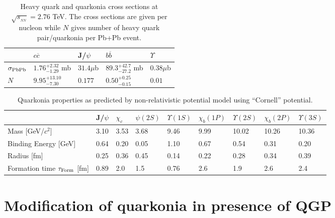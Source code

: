 \documentclass[aps,prc,preprint,superscriptaddress,showpacs,showkeys]{revtex4-1}
\begin{document}
\begin{table}
\caption[]{Heavy quark and quarkonia cross sections at
$\sqrt{s_{_{NN}}}= 2.76$ TeV. The cross sections are given per nucleon while
$N$ gives number of heavy quark pair/quarkonia per Pb+Pb event.}
\label{NLOcros}
\begin{tabular}{l|l|l|l|l} 
\hline 
\hline
                     & $ c \overline c$           &J/$\psi$      & $ b \overline b$           & $\Upsilon$   \\              
\hline
$\sigma_{\rm PbPb}$  & $1.76^{+2.32}_{-1.29}$ mb  & $31.4 \mu$b  & $89.3^{+42.7}_{-27.2}$ mb  & $0.38 \mu$b  \\
$N$                  &$9.95^{+13.10}_{-7.30}$     & $0.177$      & $0.50^{+0.25}_{-0.15}$     & $0.01$       \\
\hline
\hline
\end{tabular}
\end{table}


\begin{table}
\caption[]{Quarkonia properties as predicted by non-relativistic potential model using 
``Cornell'' potential\cite{YSuppAbdShuk}.}
\label{QuarkoniaProperties}
\begin{tabular}{l|l|l|l|l|l|l|l|l} 
\hline   
\hline
    &J/$\psi$  &$\chi_c$  &$\psi(2S)$ &$\Upsilon(1S)$ &$\chi_b(1P)$ &$\Upsilon(2S)$ &$\chi_b(2P)$ &$\Upsilon(3S)$ \\ 
\hline 
Mass [GeV/$c^2$]                      &3.10     &3.53  &3.68  &9.46  &9.99  &10.02  &10.26   &10.36 \\
Binding Energy [GeV]                  &0.64     &0.20  &0.05  &1.10  &0.67  &0.54   &0.31    &0.20 \\
Radius [fm]                            &0.25     &0.36  &0.45  &0.14  &0.22  &0.28   &0.34    &0.39 \\
Formation time $\tau_{\rm Form}$ [fm]  &0.89     &2.0   &1.5   &0.76  &2.6   &1.9    &2.6      &2.4 \\
\hline
\hline
\end{tabular}
\end{table}






\section{Modification of quarkonia in presence of QGP}
\end{document}
